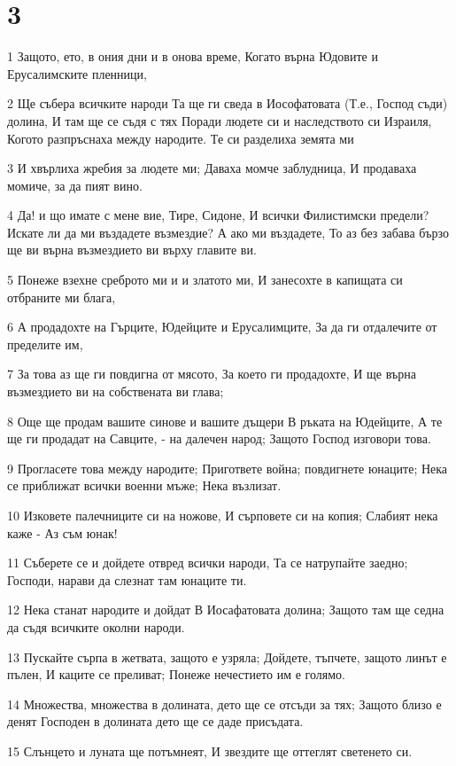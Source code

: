 \chapter{3}

\par 1 Защото, ето, в ония дни и в онова време, Когато върна Юдовите и Ерусалимските пленници,
\par 2 Ще събера всичките народи Та ще ги сведа в Иософатовата (Т.е., Господ съди) долина, И там ще се съдя с тях Поради людете си и наследството си Израиля, Когото разпръснаха между народите. Те си разделиха земята ми
\par 3 И хвърлиха жребия за людете ми; Даваха момче заблудница, И продаваха момиче, за да пият вино.
\par 4 Да! и що имате с мене вие, Тире, Сидоне, И всички Филистимски предели? Искате ли да ми въздадете възмездие? А ако ми въздадете, То аз без забава бързо ще ви върна възмездието ви върху главите ви.
\par 5 Понеже взехне среброто ми  и и златото ми, И занесохте в капищата си отбраните ми блага,
\par 6 А продадохте на Гърците, Юдейците и Ерусалимците, За да ги отдалечите от пределите им,
\par 7 За това аз ще ги повдигна от мясото, За което ги продадохте, И ще върна възмездието ви на собствената ви глава;
\par 8 Още ще продам вашите синове и вашите дъщери В ръката на Юдейците, А те ще ги продадат на Савците, - на далечен народ; Защото Господ изговори това.
\par 9 Прогласете това между народите; Пригответе война; повдигнете юнаците; Нека се приближат всички  военни мъже; Нека възлизат.
\par 10 Изковете палечниците си на ножове, И сърповете си на копия; Слабият нека каже - Аз съм юнак!
\par 11 Съберете се и дойдете отвред всички народи, Та се натрупайте заедно; Господи, нарави да слезнат там юнаците ти.
\par 12 Нека станат народите и дойдат В Иосафатовата долина; Защото там ще седна да съдя всичките околни народи.
\par 13 Пускайте сърпа в жетвата, защото е узряла; Дойдете, тъпчете, защото линът е пълен, И каците се преливат; Понеже нечестието им е голямо.
\par 14 Множества, множества в долината, дето ще се отсъди за тях; Защото близо е денят Господен в долината дето ще се даде присъдата.
\par 15 Слънцето и луната ще потъмнеят, И звездите ще оттеглят светенето си.
